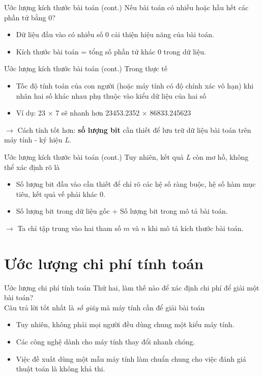 \documentclass[10pt]{beamer}
\begin{document}
\begin{frame}{Ước lượng kích thước bài toán (cont.)}
Nếu bài toán có nhiều hoặc hầu hết các phần tử bằng 0?
\begin{itemize}
\item Dữ liệu đầu vào có nhiều số 0 cải thiện hiệu năng của bài toán.
\item Kích thước bài toán = tổng số phần tử khác 0 trong dữ liệu.
\end{itemize}
\end{frame}

\begin{frame}{Ước lượng kích thước bài toán (cont.)}
Trong thực tế
\begin{itemize}
\item Tốc độ tính toán của con người (hoặc máy tính có độ chính xác vô hạn) khi nhân hai số khác nhau phụ thuộc vào kiểu dữ liệu của hai số
\item Ví dụ: 23 $\times$ 7 sẽ nhanh hơn 23453.2352 $\times$ 86833.245623
\end{itemize}
$\rightarrow$ Cách tính tốt hơn: \textbf{số lượng bit} cần thiết để lưu trữ dữ liệu bài toán trên máy tính - ký hiệu \textit{L}.
\end{frame}

\begin{frame}{Ước lượng kích thước bài toán (cont.)}
Tuy nhiên, kết quả \textit{L} còn mơ hồ, không thể xác định rõ là
\begin{itemize}
\item Số lượng bit đầu vào cần thiết để chỉ rõ các hệ số ràng buộc, hệ số hàm mục tiêu, kết quả vế phải khác 0.
\item Số lượng bit trong dữ liệu gốc + Số lượng bit trong mô tả bài toán.
\end{itemize}
$\rightarrow$ Ta chỉ tập trung vào hai tham số $m$ và $n$ khi mô tả kích thước bài toán.
\end{frame}


\section{Ước lượng chi phí tính toán}
\begin{frame}{Ước lượng chi phí tính toán}
Thứ hai, làm thế nào để xác định chi phí để giải một bài toán?\\
Câu trả lời tốt nhất là \textit{số giây} mà máy tính cần để giải bài toán
\begin{itemize}
\item Tuy nhiên, không phải mọi người đều dùng chung một kiểu máy tính.
\item Các công nghệ dành cho máy tính thay đổi nhanh chóng.
\item Việc đề xuất dùng một mẫu máy tính làm chuẩn chung cho việc đánh giá thuật toán là không khả thi.
\end{itemize}
\end{frame}
\end{document}

